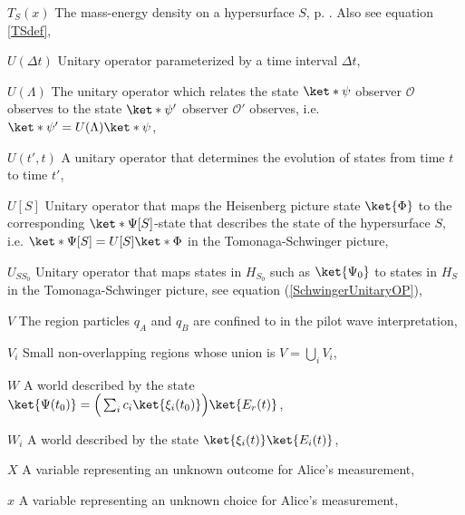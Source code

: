 \begin{thenomenclature}
  \item [{$T_S(x)$  }]\begingroup The mass-energy density on a hypersurface $S$, p. \pageref{firstTS}. Also see equation \ref{TSdef}, \nomrefpage {}
  \item [{$U(\Delta t)$}]\begingroup Unitary operator parameterized by a time interval $\Delta t$, \nomrefpage{}
  \item [{$U(\Lambda)$}]\begingroup The unitary operator which relates the state $\ket*{\psi}$ observer $\mathcal{O}$ observes to the state $\ket*{\psi'}$ observer $\mathcal{O}'$ observes, i.e. $\ket*{\psi'}=U(\Lambda)\ket*{\psi}$, \nomrefpage{}
  \item [{$U(t',t)$}]\begingroup A unitary operator that determines the evolution of states from time $t$ to time $t'$,  \nomrefpage{}
  \item [{$U[S]$}]\begingroup Unitary operator that maps the Heisenberg picture state $\ket{\Phi}$ to the corresponding $\ket*{\Psi[S]}$-state that describes the state of the hypersurface $S$, i.e. $\ket*{\Psi[S]}=U[S]\ket*{\Phi}$ in the Tomonaga-Schwinger picture, \nomrefpage{}
  \item [{$U_{SS_0}$}]\begingroup Unitary operator that maps states in $H_{S_0}$ such as $\ket{\Psi_0}$ to states in $H_S$ in the Tomonaga-Schwinger picture, see equation (\ref{SchwingerUnitaryOP}), \nomrefpage{}
  \item [{$V$}]\begingroup The region particles $q_A$ and $q_B$ are confined to in the pilot wave interpretation, \nomrefpage{}
  \item [{$V_i$}]\begingroup Small non-overlapping regions whose union is $V=\bigcup_iV_i$, \nomrefpage{}
  \item [{$W$}]\begingroup A world described by the state $\ket{\Psi(t_0)}=\Big(\sum_i c_i \ket{\xi_i(t_0)}\Big)\ket{E_r(t)}$,  \nomrefpage{}
  \item [{$W_i$}]\begingroup A world described by the state $\ket{\xi_i(t)}\ket{E_i(t)}$,  \nomrefpage{}
  \item [{$X$}]\begingroup A variable representing an unknown outcome for Alice's measurement, \nomrefpage{}
  \item [{$x$}]\begingroup A variable representing an unknown choice for Alice's measurement, \nomrefpage{}

\end{thenomenclature}
